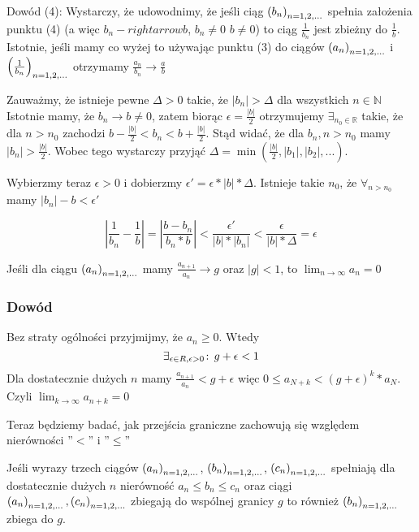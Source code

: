 \documentclass[9pt]{article}
\begin{document}
\bigbreak

Dowód (4): Wystarczy, że udowodnimy, że jeśli ciąg $\left(b_n\right)_{n = 1,2,...}$ spełnia założenia punktu (4) (a więc
$b_n -rightarrow b$, $b_n \ne 0$ $b \ne 0$) to ciąg $\frac{1}{b_n}$ jest zbieżny do $\frac{1}{b}$.
Istotnie, jeśli mamy co wyżej to używając punktu (3) do ciągów $\left(a_n\right)_{n = 1,2,...}$ i $\left(\frac{1}{b_n}\right)_{n = 1,2,...}$
otrzymamy $\frac{a_n}{b_n} \rightarrow \frac{a}{b}$

Zauważmy, że istnieje pewne $\Delta > 0$ takie, że $|b_n| > \Delta$ dla wszystkich $n \in
\mathbb{N}$ Istotnie mamy, że $b_n \rightarrow b \ne 0$, zatem biorąc $\epsilon = \frac{|b|}{2}$
otrzymujemy $\exists_{n_0 \in \mathbb{R}}$ takie, że dla $n > n_0$ zachodzi $b - \frac{|b|}{2} < b_n
< b+\frac{|b|}{2}$. Stąd widać, że dla $b_n, n > n_0$ mamy $|b_n| > \frac{|b|}{2}$. Wobec tego
wystarczy przyjąć $\Delta = \min(\frac{|b|}{2}, |b_1|, |b_2|, ...)$.

Wybierzmy teraz $\epsilon > 0$ i dobierzmy $\epsilon' = \epsilon * |b| *\Delta$. Istnieje takie
$n_0$, że $\forall_{n > n_0}$ mamy $|b_n| - b < \epsilon'$

\[
    \left|\frac{1}{b_n} - \frac{1}{b}\right| = \left|\frac{b-b_n}{b_n * b} \right| <
    \frac{\epsilon'}{|b| * |b_n|} < \frac{\epsilon}{|b|*\Delta} = \epsilon
\]

\begin{Twi}
    Jeśli dla ciągu $\left(a_n\right)_{n = 1,2,...}$ mamy $\frac{a_{n+1}}{a_n} \to g$ oraz $|g| < 1$, to $\lim_{n \to
    \infty}{a_n} = 0$
\end{Twi}

\subsubsection*{Dowód}
Bez straty ogólności przyjmijmy, że $a_n \ge 0$. Wtedy
\[
    \exists_{\epsilon \in R, \epsilon > 0} \! : \, g + \epsilon < 1
\]
Dla dostatecznie dużych $n$ mamy $\frac{a_{n+1}}{a_n} < g+\epsilon$ więc
$0 \le a_{N+k} < (g+\epsilon)^k*a_N$. Czyli $\lim_{k \to \infty}a_{n+k} = 0$


Teraz będziemy badać, jak przejścia graniczne zachowują się względem nierówności ''$<$'' i ''$\le$''

\begin{Twi}
    Jeśli wyrazy trzech ciągów $\left(a_n\right)_{n = 1,2,...}$, $\left(b_n\right)_{n = 1,2,...}$, $\left(c_n\right)_{n = 1,2,...}$ spełniają dla dostatecznie dużych $n$
    nierówność $a_n \le b_n \le c_n$ oraz ciągi $\left(a_n\right)_{n = 1,2,...}, \left(c_n\right)_{n = 1,2,...}$ zbiegają do wspólnej granicy
    $g$ to również $\left(b_n\right)_{n = 1,2,...}$ zbiega do $g$.
\end{Twi}
\end{document}
